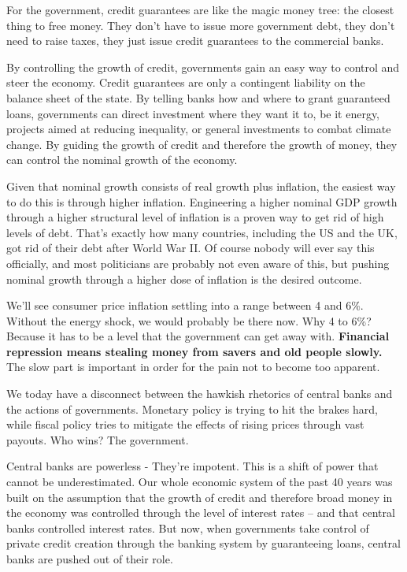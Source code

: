 \documentclass[
]{book}
\begin{document}
For the government, credit guarantees are like the magic money tree: the closest thing to free money. They don't have to issue more government debt, they don't need to raise taxes, they just issue credit guarantees to the commercial banks.

By controlling the growth of credit, governments gain an easy way to control and steer the economy.
Credit guarantees are only a contingent liability on the balance sheet of the state. By telling banks how and where to grant guaranteed loans, governments can direct investment where they want it to, be it energy, projects aimed at reducing inequality, or general investments to combat climate change. By guiding the growth of credit and therefore the growth of money, they can control the nominal growth of the economy.

Given that nominal growth consists of real growth plus inflation, the easiest way to do this is through higher inflation.
Engineering a higher nominal GDP growth through a higher structural level of inflation is a proven way to get rid of high levels of debt. That's exactly how many countries, including the US and the UK, got rid of their debt after World War II. Of course nobody will ever say this officially, and most politicians are probably not even aware of this, but pushing nominal growth through a higher dose of inflation is the desired outcome.

We'll see consumer price inflation settling into a range between 4 and 6\%. Without the energy shock, we would probably be there now. Why 4 to 6\%? Because it has to be a level that the government can get away with. \textbf{Financial repression means stealing money from savers and old people slowly.} The slow part is important in order for the pain not to become too apparent.

We today have a disconnect between the hawkish rhetorics of central banks and the actions of governments. Monetary policy is trying to hit the brakes hard, while fiscal policy tries to mitigate the effects of rising prices through vast payouts.
Who wins?
The government.

Central banks are powerless -
They're impotent. This is a shift of power that cannot be underestimated. Our whole economic system of the past 40 years was built on the assumption that the growth of credit and therefore broad money in the economy was controlled through the level of interest rates -- and that central banks controlled interest rates. But now, when governments take control of private credit creation through the banking system by guaranteeing loans, central banks are pushed out of their role.
\end{document}
